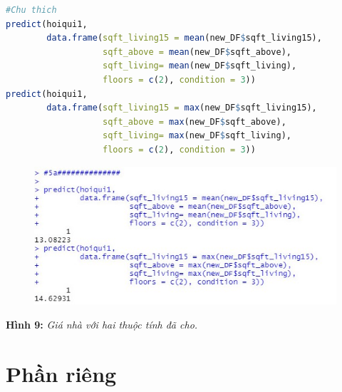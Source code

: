 \documentclass[a4paper]{article}
\theoremstyle{definition}
\begin{document}
\begin{itemize}
\begin{enumerate}
        \begin{lstlisting}[language=R, caption=Code for question 5]
#Chu thich        
predict(hoiqui1, 
        data.frame(sqft_living15 = mean(new_DF$sqft_living15), 
                   sqft_above = mean(new_DF$sqft_above), 
                   sqft_living= mean(new_DF$sqft_living), 
                   floors = c(2), condition = 3))
predict(hoiqui1, 
        data.frame(sqft_living15 = max(new_DF$sqft_living15), 
                   sqft_above = max(new_DF$sqft_above), 
                   sqft_living= max(new_DF$sqft_living), 
                   floors = c(2), condition = 3))
        \end{lstlisting} 
        
        \begin{figure}[H]
            \centering
            \includegraphics[scale=0.8]{5a.jpg}
            \label{fig:my_label}
        \end{figure}
        
        \begin{center}
            \textbf{Hình 9: }\textit{Giá nhà với hai thuộc tính đã cho.}
        \end{center}
                    
    \end{enumerate}



\section{Phần riêng}\label{objective}

\end{itemize}
\end{document}
